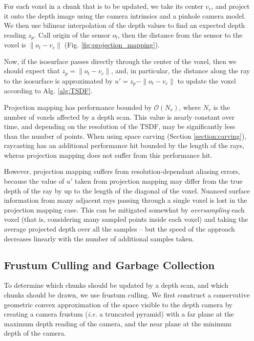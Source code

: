 \documentclass[10pt,twocolumn,letterpaper]{article}
\begin{document}
For each voxel in a chunk that is to be updated, we take its center $v_c$, and
project it onto the depth image using the camera intrinsics and a pinhole camera
model. We then use bilinear interpolation of the depth values to find an
expected depth reading $z_p$. Call origin of the sensor  $o_t$,   then the 
distance from the sensor to the voxel is $\|o_t - v_c\|$ (Fig. \ref{fig:projection_mapping}).

Now, if the isosurface passes directly through the center of the voxel,
then we should expect that $z_p = \|o_t - v_c\|$, and, in particular, the
distance along the ray to the isosurface is approximated by $u' = z_p - \|o_t -
v_c\|$ to update the voxel according to Alg. \ref{alg:TSDF}.

Projection mapping has performance bounded by $\mathcal{O}(N_v)$, where $N_v$ is
the number of voxels affected by a depth scan. This value is nearly constant
over time, and depending on the resolution of the TSDF, may be significantly
less than the number of points. When using space carving (Section
\ref{section:carving}), raycasting has an additional performance hit bounded by
the length of the rays, wheras projection mapping does not suffer from this
performance hit.

However, projection mapping suffers from resolution-dependant aliasing errors,
because the value of $u'$ taken from projection mapping may differ from the true
depth of the ray by up to the length of the diagonal of the voxel. Nuanced
surface information from many adjacent rays passing through a single voxel is
lost in the projection mapping case. This can be mitigated somewhat by
\textit{oversampling} each voxel (that is, considering many sampled points
inside each voxel) and taking the average projected depth over all the samples
-- but the speed of the approach decreases linearly with the number of 
additional samples taken. 

\subsection{Frustum Culling and Garbage Collection}
To determine which chunks should be updated by a depth scan, and which chunks
should be drawn, we use frustum culling. We first construct a conservative
geometric convex approximation of the space visible to the depth camera by
creating a camera frustum (\textit{i.e.} a truncated pyramid) with a far plane
at the maximum depth reading of the camera, and the near plane at the minimum
depth of the camera. 
\end{document}
